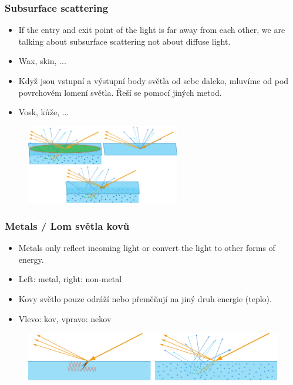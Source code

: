 \begin{frame}\frametitle{Subsurface scattering}
  \scriptsize
  \begin{itemize}
    \item If the entry and exit point of the light is far away from each other, we are talking about subsurface scattering not about diffuse light.
    \item Wax, skin, ...
  \end{itemize}
  \begin{itemize}
    \item Když jsou vstupní a výstupní body světla od sebe daleko, mluvíme od pod povrchovém lomení světla. Řeší se pomocí jiných metod.
    \item Vosk, kůže, ...
  \end{itemize}
  \begin{figure}[ht]
  \includegraphics[width=0.6\textwidth]{pics/physicallyBasedRendering/subsurface_pixel_size}
  \end{figure}
\end{frame}

\begin{frame}\frametitle{Metals / Lom světla kovů}
  \scriptsize
  \begin{itemize}
    \item Metals only reflect incoming light or convert the light to other forms of energy.
    \item Left: metal, right: non-metal
  \end{itemize}
  \begin{itemize}
    \item Kovy světlo pouze odráží nebo přeměňují na jiný druh energie (teplo).
    \item Vlevo: kov, vpravo: nekov
  \end{itemize}
  \begin{figure}[ht]
    \includegraphics[width=\textwidth]{pics/physicallyBasedRendering/metal_refraction}
  \end{figure}
\end{frame}

